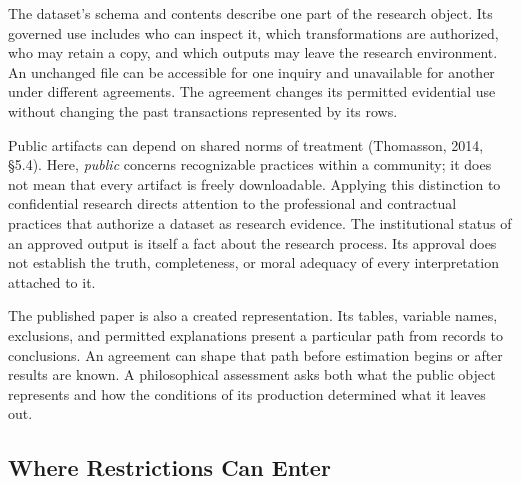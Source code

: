 \noindent The dataset's schema and contents describe one part of the research
object. Its governed use includes who can inspect it, which
transformations are authorized, who may retain a copy, and which outputs
may leave the research environment. An unchanged file can be accessible
for one inquiry and unavailable for another under different agreements.
The agreement changes its permitted evidential use without changing the
past transactions represented by its rows.

Public artifacts can depend on shared norms of treatment (Thomasson,
2014, §5.4). Here, \emph{public} concerns recognizable practices within
a community; it does not mean that every artifact is freely
downloadable. Applying this distinction to confidential research directs
attention to the professional and contractual practices that authorize a
dataset as research evidence. The institutional status of an approved
output is itself a fact about the research process. Its approval does
not establish the truth, completeness, or moral adequacy of every
interpretation attached to it.

The published paper is also a created representation. Its tables,
variable names, exclusions, and permitted explanations present a
particular path from records to conclusions. An agreement can shape that
path before estimation begins or after results are known. A
philosophical assessment asks both what the public object represents and
how the conditions of its production determined what it leaves out.

\hypertarget{M09-where-restrictions-can-enter}{%
\subsection{Where Restrictions Can
Enter}\label{M09-where-restrictions-can-enter}}


